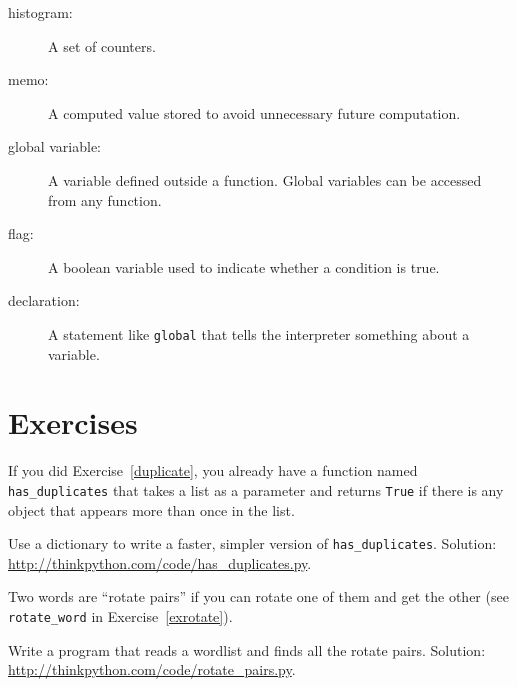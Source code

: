 \documentclass[10pt]{book}
\begin{document}
\begin{description}
\item[histogram:] A set of counters.

\item[memo:] A computed value stored to avoid unnecessary future 
computation.

\item[global variable:]  A variable defined outside a function.  Global
variables can be accessed from any function.

\item[flag:] A boolean variable used to indicate whether a condition
is true.

\item[declaration:] A statement like {\tt global} that tells the
interpreter something about a variable.

\end{description}

\section{Exercises}

\begin{exercise}

If you did Exercise~\ref{duplicate}, you already have
a function named \verb"has_duplicates" that takes a list
as a parameter and returns {\tt True} if there is any object
that appears more than once in the list.

Use a dictionary to write a faster, simpler version of
\verb"has_duplicates". 
Solution: \url{http://thinkpython.com/code/has_duplicates.py}.

\end{exercise}


\begin{exercise}
\label{exrotatepairs}

Two words are ``rotate pairs'' if you can rotate one of them
and get the other (see \verb"rotate_word" in Exercise~\ref{exrotate}).

Write a program that reads a wordlist and finds all the rotate
pairs.  Solution: \url{http://thinkpython.com/code/rotate_pairs.py}.

\end{exercise}
\end{document}
